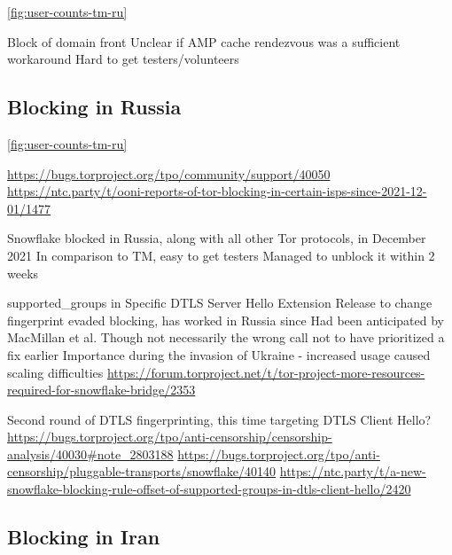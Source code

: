\documentclass[letterpaper,twocolumn]{article}
\begin{document}
\autoref{fig:user-counts-tm-ru}

Block of domain front
Unclear if AMP cache rendezvous was a sufficient workaround
Hard to get testers/volunteers

\subsection{Blocking in Russia}
\label{sec:block-ru}




\autoref{fig:user-counts-tm-ru}

\url{https://bugs.torproject.org/tpo/community/support/40050}
\url{https://ntc.party/t/ooni-reports-of-tor-blocking-in-certain-isps-since-2021-12-01/1477}

Snowflake blocked in Russia, along with all other Tor protocols,
in December 2021 \cite{ooni-2021-russia-blocks-tor}
In comparison to TM, easy to get testers
Managed to unblock it within 2 weeks

supported\_groups in Specific DTLS Server Hello Extension
Release to change fingerprint evaded blocking, has worked in Russia since
Had been anticipated by MacMillan et al.\cite[\S 3]{arxiv.2008.03254}
Though not necessarily the wrong call not to have prioritized a fix earlier
Importance during the invasion of Ukraine
- increased usage caused scaling difficulties
  \url{https://forum.torproject.net/t/tor-project-more-resources-required-for-snowflake-bridge/2353}

Second round of DTLS fingerprinting, this time targeting DTLS Client Hello?
\url{https://bugs.torproject.org/tpo/anti-censorship/censorship-analysis/40030#note_2803188}
\url{https://bugs.torproject.org/tpo/anti-censorship/pluggable-transports/snowflake/40140}
\url{https://ntc.party/t/a-new-snowflake-blocking-rule-offset-of-supported-groups-in-dtls-client-hello/2420}

\subsection{Blocking in Iran}
\label{sec:block-ir}

\end{document}
